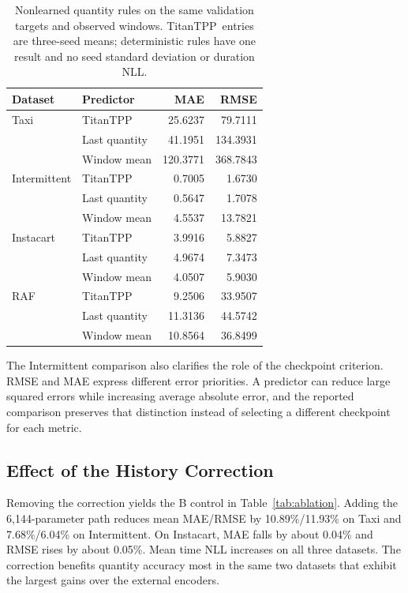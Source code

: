 \documentclass[runningheads]{llncs}
\newcommand{\method}{TitanTPP}
\begin{document}
\begin{table}[t]
\caption{Nonlearned quantity rules on the same validation targets and
observed windows. \method\ entries are three-seed means; deterministic rules
have one result and no seed standard deviation or duration NLL.}
\label{tab:naive}\centering\small
\begin{tabular}{llrr}
\toprule
Dataset & Predictor & MAE & RMSE\\
\midrule
Taxi & TitanTPP & 25.6237 & 79.7111\\
 & Last quantity & 41.1951 & 134.3931\\
 & Window mean & 120.3771 & 368.7843\\
\midrule
Intermittent & TitanTPP & 0.7005 & 1.6730\\
 & Last quantity & 0.5647 & 1.7078\\
 & Window mean & 4.5537 & 13.7821\\
\midrule
Instacart & TitanTPP & 3.9916 & 5.8827\\
 & Last quantity & 4.9674 & 7.3473\\
 & Window mean & 4.0507 & 5.9030\\
\midrule
RAF & TitanTPP & 9.2506 & 33.9507\\
 & Last quantity & 11.3136 & 44.5742\\
 & Window mean & 10.8564 & 36.8499\\
\bottomrule
\end{tabular}
\end{table}

The Intermittent comparison also clarifies the role of the checkpoint
criterion. RMSE and MAE express different error priorities. A predictor can
reduce large squared errors while increasing average absolute error, and the
reported comparison preserves that distinction instead of selecting a
different checkpoint for each metric.

\subsection{Effect of the History Correction}
Removing the correction yields the B control in Table~\ref{tab:ablation}.
Adding the 6,144-parameter path reduces mean MAE/RMSE by 10.89\%/11.93\% on
Taxi and 7.68\%/6.04\% on Intermittent. On Instacart, MAE falls by about
0.04\% and RMSE rises by about 0.05\%. Mean time NLL increases on all three
datasets. The correction benefits quantity accuracy most in the same two
datasets that exhibit the largest gains over the external encoders.
\end{document}
